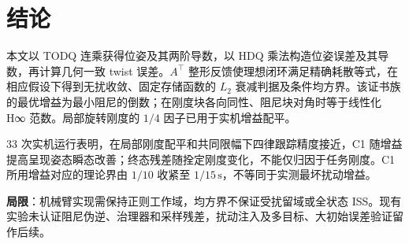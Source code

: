 \section{结论}

本文以 TODQ 连乘获得位姿及其两阶导数，以 HDQ 乘法构造位姿误差及其导数，再计算几何一致 twist 误差。$A^\top$ 整形反馈使理想闭环满足精确耗散等式，在相应假设下得到无扰收敛、固定存储函数的 $L_2$ 衰减判据及条件均方界。该证书族的最优增益为最小阻尼的倒数；在刚度块各向同性、阻尼块对角时等于线性化 H∞ 范数。局部旋转刚度的 $1/4$ 因子已用于实机增益配平。

33 次实机运行表明，在局部刚度配平和共同限幅下四律跟踪精度接近，C1 随增益提高呈现姿态瞬态改善；终态残差随拴定刚度变化，不能仅归因于任务刚度。C1 所用增益对应的理论界由 $1/10$ 收紧至 $1/15\,\mathrm{s}$，不等同于实测最坏扰动增益。

\textbf{局限}：机械臂实现需保持正则工作域，均方界不保证受扰留域或全状态 ISS。现有实验未认证阻尼伪逆、治理器和采样残差，扰动注入及多目标、大初始误差验证留作后续。
